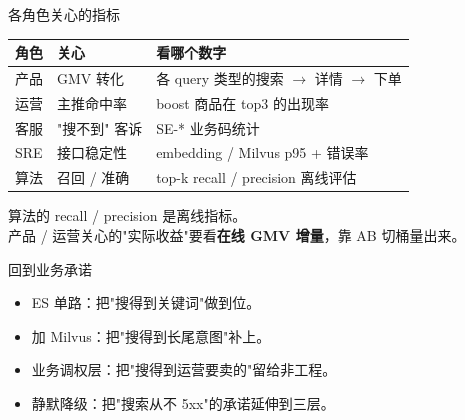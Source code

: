 \begin{frame}{各角色关心的指标}
\begin{tabular}{@{}lll@{}}
\toprule
角色 & 关心 & 看哪个数字 \\
\midrule
产品 & GMV 转化     & 各 query 类型的搜索 $\to$ 详情 $\to$ 下单 \\
运营 & 主推命中率   & boost 商品在 top3 的出现率 \\
客服 & "搜不到" 客诉 & SE-* 业务码统计 \\
SRE  & 接口稳定性   & embedding / Milvus p95 + 错误率 \\
算法 & 召回 / 准确  & top-k recall / precision 离线评估 \\
\bottomrule
\end{tabular}
\vspace{2mm}
\small 算法的 recall / precision 是离线指标。\\
产品 / 运营关心的"实际收益"要看\textbf{在线 GMV 增量}，靠 AB 切桶量出来。
\end{frame}

\begin{frame}{回到业务承诺}
\begin{itemize}
  \item ES 单路：把"搜得到关键词"做到位。
  \item 加 Milvus：把"搜得到长尾意图"补上。
  \item 业务调权层：把"搜得到运营要卖的"留给非工程。
  \item 静默降级：把"搜索从不 5xx"的承诺延伸到三层。
\end{itemize}
\vspace{2mm}
\end{frame}

\appendix

